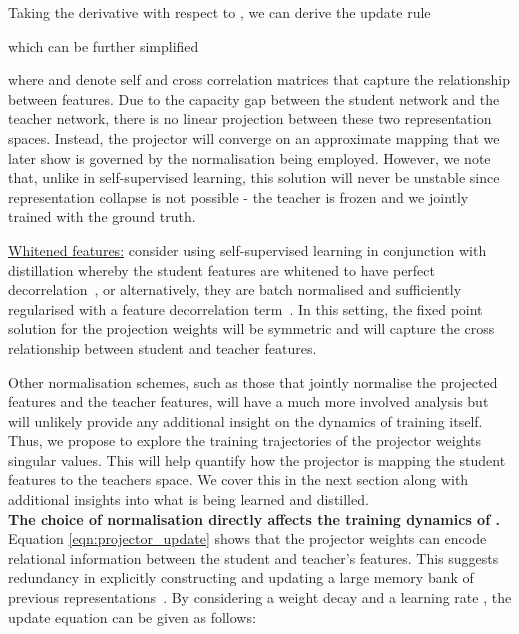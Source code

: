 \documentclass[letterpaper]{article} \usepackage[submission]{aaai23}  \usepackage{times}  \usepackage{helvet}  \usepackage{courier}  \usepackage[hyphens]{url}  \usepackage{graphicx} \urlstyle{rm} \def\UrlFont{\rm}  \usepackage{natbib}  \usepackage{caption} \frenchspacing  \setlength{\pdfpagewidth}{8.5in} \setlength{\pdfpageheight}{11in} \usepackage{algorithm}
\begin{document}
Taking the derivative with respect to , we can derive the update rule 

which can be further simplified

where  and  denote self and cross correlation matrices that capture the relationship between features. Due to the capacity gap between the student network and the teacher network, there is no linear projection between these two representation spaces. Instead, the projector will converge on an approximate mapping that we later show is governed by the normalisation being employed. However, we note that, unlike in self-supervised learning, this solution will never be unstable since representation collapse is not possible - the teacher is frozen and we jointly trained with the ground truth. 

\underline{Whitened features:} consider using self-supervised learning in conjunction with distillation whereby the student features are whitened to have perfect decorrelation~\cite{Ermolov2020WhiteningLearning}, or alternatively, they are batch normalised and sufficiently regularised with a feature decorrelation term~\cite{Bardes2022VICReg:Learning}. In this setting, the fixed point solution for the projection weights will be symmetric and will capture the cross relationship between student and teacher features.









Other normalisation schemes, such as those that jointly normalise the projected features and the teacher features, will have a much more involved analysis but will unlikely provide any additional insight on the dynamics of training itself. Thus, we propose to explore the training trajectories of the projector weights singular values. This will help quantify how the projector is mapping the student features to the teachers space. We cover this in the next section along with additional insights into what is being learned and distilled. \\

\textbf{The choice of normalisation directly affects the training dynamics of .}
Equation \ref{eqn:projector_update} shows that the projector weights can encode relational information between the student and teacher's features. This suggests redundancy in explicitly constructing and updating a large memory bank of previous representations~\cite{Tian2019ContrastiveDistillation}. By considering a weight decay  and a learning rate , the update equation can be given as follows:
\end{document}
